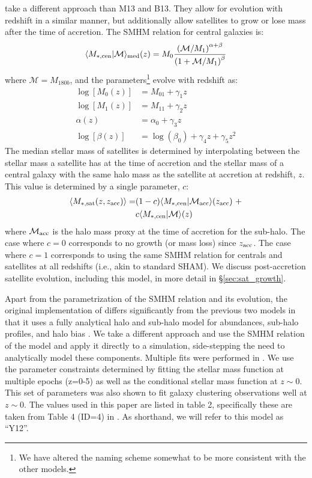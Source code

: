 \documentclass[useAMS,fleqn,usenatbib]{mnras}
\begin{document}
\cite{Yang:2012ew} take a different approach than M13 and B13.  They allow for evolution with redshift in a similar manner, but additionally allow satellites to grow or lose mass after the time of accretion.  The SMHM relation for central galaxies is: 
%
\begin{equation}
\langle M_{*,\rm cen} |  \mathcal{M} \rangle_{\rm med}(z) = M_{0}\frac{\left( \mathcal{M}/M_1 \right)^{\alpha+\beta}}{\left(1+ \mathcal{M}/M_1 \right)^{\beta}}
\end{equation}  
%
where $\mathcal{M}=M_{180b}$, and the parameters\footnote{We have altered the naming scheme somewhat to be more consistent with the other models.} evolve with redshift as:
%
\begin{align}
\log[M_{0}(z)] &= M_{01} + \gamma_1 z \\
\log[M_{1}(z)] &= M_{11} + \gamma_2 z \\
\alpha(z) &= \alpha_0 + \gamma_3 z \\
\log[\beta(z)] &= \log(\beta_0) + \gamma_4 z + \gamma_5 z^2
\end{align}
%
The median stellar mass of satellites is determined by interpolating between the stellar mass a satellite has at the time of accretion and the stellar mass of a central galaxy with the same halo mass as the satellite at accretion at redshift, $z$.  This value is determined by a single parameter, $c$:
%
\begin{align}
\label{eq:y12sat_model}
\langle M_{*,\rm sat}(z, z_{\rm acc})\rangle =&  (1-c)\langle M_{*,\rm cen} |  \mathcal{M}_{\rm acc} \rangle(z_{\rm acc})~+ \\ \nonumber &  c\langle M_{*,\rm cen}|  \mathcal{M} \rangle(z)
\end{align}
%
where $\mathcal{M}_{\rm acc}$ is the halo mass proxy at the time of accretion for the sub-halo.  The case where $c=0$ corresponds to no growth (or mass loss) since $z_{\rm acc}$.  The case where $c=1$ corresponds to using the same SMHM relation for centrals and satellites at all redshifts (i.e., akin to standard SHAM).  We discuss post-accretion satellite evolution, including this model, in more detail in \S \ref{sec:sat_growth}.

Apart from the parametrization of the SMHM relation and its evolution, the original implementation of \cite{Yang:2012ew} differs significantly from the previous two models in that it uses a fully analytical halo and sub-halo model for abundances, sub-halo profiles, and halo bias \citep[see][]{Yang:2011ou}.  We take a different approach and use the SMHM relation of the model and apply it directly to a simulation, side-stepping the need to analytically model these components.  Multiple fits were performed in \citet[][]{Yang:2012ew}.  We use the parameter constraints determined by fitting the stellar mass function at multiple epochs (z=0-5) as well as the conditional stellar mass function at $z \sim 0$.  This set of parameters was also shown to fit galaxy clustering observations well at $z\sim 0$.  The values used in this paper are listed in table 2, specifically these are taken from Table 4 (ID=4) in \citet[][]{Yang:2012ew}.  As shorthand, we will refer to this model as ``Y12''.
\end{document}
